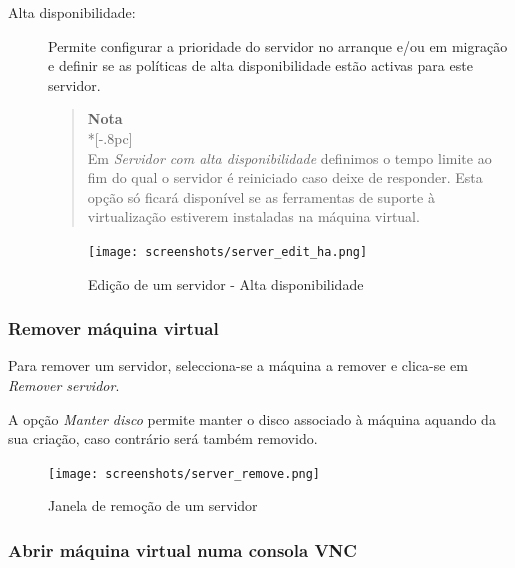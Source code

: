 \begin{description}
	\item[Alta disponibilidade:] Permite configurar a prioridade do servidor no arranque e/ou em migração e definir se as políticas de alta disponibilidade estão activas para este servidor.

                \begin{quote}
                    {\large \bf Nota} \\*[-.8pc]
                    \underline{\hspace{6in}} \\
                    Em \emph{Servidor com alta disponibilidade} definimos o tempo limite ao fim do qual
                        o servidor é reiniciado caso deixe de responder.
                    Esta opção só ficará disponível se as ferramentas de suporte à virtualização estiverem instaladas na máquina virtual.
                \end{quote}
                    
		\begin{figure}[H]
        		\begin{center}
		        \texttt{[image: screenshots/server\_edit\_ha.png]}
        		\caption{Edição de um servidor - Alta disponibilidade}
	        	\label{fig:server_edit_ha}
	        	\end{center}
		\end{figure}

\end{description}


\subsubsection{Remover máquina virtual}
\label{sec:remove_server}
Para remover um servidor, selecciona-se a máquina a remover e clica-se em \emph{Remover servidor}.

A opção \emph{Manter disco} permite manter o disco associado à máquina aquando da sua criação, caso contrário será também removido.
		
\begin{figure}[H]
	\begin{center}
	\texttt{[image: screenshots/server\_remove.png]}
	\caption{Janela de remoção de um servidor}
	\label{fig:server_remove}
	\end{center}
\end{figure}

\subsubsection{Abrir máquina virtual numa consola VNC}
\label{sec:open_vnc}

